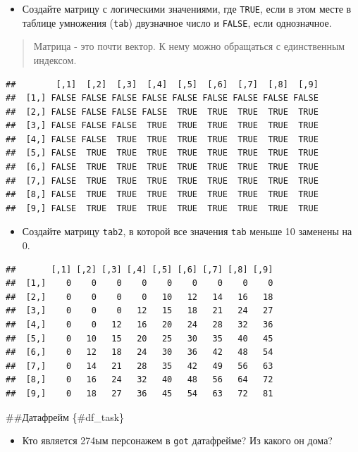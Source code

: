 \documentclass[]{book}
\providecommand{\tightlist}{%
  \setlength{\itemsep}{0pt}\setlength{\parskip}{0pt}}
\begin{document}
\begin{itemize}
\tightlist
\item
  Создайте матрицу с логическими значениями, где \texttt{TRUE}, если в этом месте в таблице умножения (\texttt{tab}) двузначное число и \texttt{FALSE}, если однозначное.
\end{itemize}

\begin{quote}
Матрица - это почти вектор. К нему можно обращаться с единственным индексом.
\end{quote}

\begin{verbatim}
##        [,1]  [,2]  [,3]  [,4]  [,5]  [,6]  [,7]  [,8]  [,9]
##  [1,] FALSE FALSE FALSE FALSE FALSE FALSE FALSE FALSE FALSE
##  [2,] FALSE FALSE FALSE FALSE  TRUE  TRUE  TRUE  TRUE  TRUE
##  [3,] FALSE FALSE FALSE  TRUE  TRUE  TRUE  TRUE  TRUE  TRUE
##  [4,] FALSE FALSE  TRUE  TRUE  TRUE  TRUE  TRUE  TRUE  TRUE
##  [5,] FALSE  TRUE  TRUE  TRUE  TRUE  TRUE  TRUE  TRUE  TRUE
##  [6,] FALSE  TRUE  TRUE  TRUE  TRUE  TRUE  TRUE  TRUE  TRUE
##  [7,] FALSE  TRUE  TRUE  TRUE  TRUE  TRUE  TRUE  TRUE  TRUE
##  [8,] FALSE  TRUE  TRUE  TRUE  TRUE  TRUE  TRUE  TRUE  TRUE
##  [9,] FALSE  TRUE  TRUE  TRUE  TRUE  TRUE  TRUE  TRUE  TRUE
\end{verbatim}

\begin{itemize}
\tightlist
\item
  Создайте матрицу \texttt{tab2}, в которой все значения \texttt{tab} меньше 10 заменены на 0.
\end{itemize}

\begin{verbatim}
##       [,1] [,2] [,3] [,4] [,5] [,6] [,7] [,8] [,9]
##  [1,]    0    0    0    0    0    0    0    0    0
##  [2,]    0    0    0    0   10   12   14   16   18
##  [3,]    0    0    0   12   15   18   21   24   27
##  [4,]    0    0   12   16   20   24   28   32   36
##  [5,]    0   10   15   20   25   30   35   40   45
##  [6,]    0   12   18   24   30   36   42   48   54
##  [7,]    0   14   21   28   35   42   49   56   63
##  [8,]    0   16   24   32   40   48   56   64   72
##  [9,]    0   18   27   36   45   54   63   72   81
\end{verbatim}

\#\#Датафрейм \{\#df\_task\}

\begin{itemize}
\tightlist
\item
  Кто является 274ым персонажем в \texttt{got} датафрейме? Из какого он дома?
\end{itemize}
\end{document}
